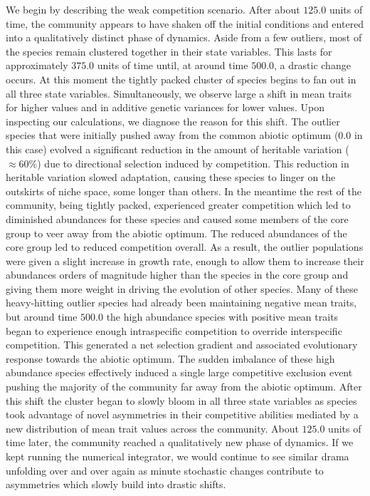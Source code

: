 \documentclass[]{article}
\begin{document}
We begin by describing the weak competition scenario. After about
\(125.0\) units of time, the community appears to have shaken off the
initial conditions and entered into a qualitatively distinct phase of
dynamics. Aside from a few outliers, most of the species remain
clustered together in their state variables. This lasts for
approximately \(375.0\) units of time until, at around time \(500.0\), a
drastic change occurs. At this moment the tightly packed cluster of
species begins to fan out in all three state variables. Simultaneously,
we observe large a shift in mean traits for higher values and in
additive genetic variances for lower values. Upon inspecting our
calculations, we diagnose the reason for this shift. The outlier species
that were initially pushed away from the common abiotic optimum (\(0.0\)
in this case) evolved a significant reduction in the amount of heritable
variation (\(\approx60\%\)) due to directional selection induced by
competition. This reduction in heritable variation slowed adaptation,
causing these species to linger on the outskirts of niche space, some
longer than others. In the meantime the rest of the community, being
tightly packed, experienced greater competition which led to diminished
abundances for these species and caused some members of the core group
to veer away from the abiotic optimum. The reduced abundances of the
core group led to reduced competition overall. As a result, the outlier
populations were given a slight increase in growth rate, enough to allow
them to increase their abundances orders of magnitude higher than the
species in the core group and giving them more weight in driving the
evolution of other species. Many of these heavy-hitting outlier species
had already been maintaining negative mean traits, but around time
\(500.0\) the high abundance species with positive mean traits began to
experience enough intraspecific competition to override interspecific
competition. This generated a net selection gradient and associated
evolutionary response towards the abiotic optimum. The sudden imbalance
of these high abundance species effectively induced a single large
competitive exclusion event pushing the majority of the community far
away from the abiotic optimum. After this shift the cluster began to
slowly bloom in all three state variables as species took advantage of
novel asymmetries in their competitive abilities mediated by a new
distribution of mean trait values across the community. About \(125.0\)
units of time later, the community reached a qualitatively new phase of
dynamics. If we kept running the numerical integrator, we would continue
to see similar drama unfolding over and over again as minute stochastic
changes contribute to asymmetries which slowly build into drastic
shifts.
\end{document}
